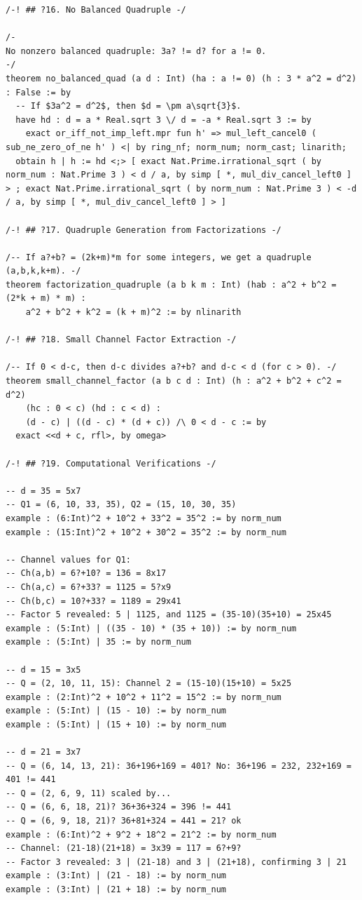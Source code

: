 \documentclass[11pt,twoside,openright]{book}
\theoremstyle{definition}
\theoremstyle{remark}
\begin{document}
\begin{lstlisting}[style=lean]
/-! ## ?16. No Balanced Quadruple -/

/-
No nonzero balanced quadruple: 3a? != d? for a != 0.
-/
theorem no_balanced_quad (a d : Int) (ha : a != 0) (h : 3 * a^2 = d^2) : False := by
  -- If $3a^2 = d^2$, then $d = \pm a\sqrt{3}$.
  have hd : d = a * Real.sqrt 3 \/ d = -a * Real.sqrt 3 := by
    exact or_iff_not_imp_left.mpr fun h' => mul_left_cancel0 ( sub_ne_zero_of_ne h' ) <| by ring_nf; norm_num; norm_cast; linarith;
  obtain h | h := hd <;> [ exact Nat.Prime.irrational_sqrt ( by norm_num : Nat.Prime 3 ) < d / a, by simp [ *, mul_div_cancel_left0 ] > ; exact Nat.Prime.irrational_sqrt ( by norm_num : Nat.Prime 3 ) < -d / a, by simp [ *, mul_div_cancel_left0 ] > ]

/-! ## ?17. Quadruple Generation from Factorizations -/

/-- If a?+b? = (2k+m)*m for some integers, we get a quadruple (a,b,k,k+m). -/
theorem factorization_quadruple (a b k m : Int) (hab : a^2 + b^2 = (2*k + m) * m) :
    a^2 + b^2 + k^2 = (k + m)^2 := by nlinarith

/-! ## ?18. Small Channel Factor Extraction -/

/-- If 0 < d-c, then d-c divides a?+b? and d-c < d (for c > 0). -/
theorem small_channel_factor (a b c d : Int) (h : a^2 + b^2 + c^2 = d^2)
    (hc : 0 < c) (hd : c < d) :
    (d - c) | ((d - c) * (d + c)) /\ 0 < d - c := by
  exact <<d + c, rfl>, by omega>

/-! ## ?19. Computational Verifications -/

-- d = 35 = 5x7
-- Q1 = (6, 10, 33, 35), Q2 = (15, 10, 30, 35)
example : (6:Int)^2 + 10^2 + 33^2 = 35^2 := by norm_num
example : (15:Int)^2 + 10^2 + 30^2 = 35^2 := by norm_num

-- Channel values for Q1:
-- Ch(a,b) = 6?+10? = 136 = 8x17
-- Ch(a,c) = 6?+33? = 1125 = 5?x9
-- Ch(b,c) = 10?+33? = 1189 = 29x41
-- Factor 5 revealed: 5 | 1125, and 1125 = (35-10)(35+10) = 25x45
example : (5:Int) | ((35 - 10) * (35 + 10)) := by norm_num
example : (5:Int) | 35 := by norm_num

-- d = 15 = 3x5
-- Q = (2, 10, 11, 15): Channel 2 = (15-10)(15+10) = 5x25
example : (2:Int)^2 + 10^2 + 11^2 = 15^2 := by norm_num
example : (5:Int) | (15 - 10) := by norm_num
example : (5:Int) | (15 + 10) := by norm_num

-- d = 21 = 3x7
-- Q = (6, 14, 13, 21): 36+196+169 = 401? No: 36+196 = 232, 232+169 = 401 != 441
-- Q = (2, 6, 9, 11) scaled by...
-- Q = (6, 6, 18, 21)? 36+36+324 = 396 != 441
-- Q = (6, 9, 18, 21)? 36+81+324 = 441 = 21? ok
example : (6:Int)^2 + 9^2 + 18^2 = 21^2 := by norm_num
-- Channel: (21-18)(21+18) = 3x39 = 117 = 6?+9?
-- Factor 3 revealed: 3 | (21-18) and 3 | (21+18), confirming 3 | 21
example : (3:Int) | (21 - 18) := by norm_num
example : (3:Int) | (21 + 18) := by norm_num
\end{lstlisting}
\end{document}
